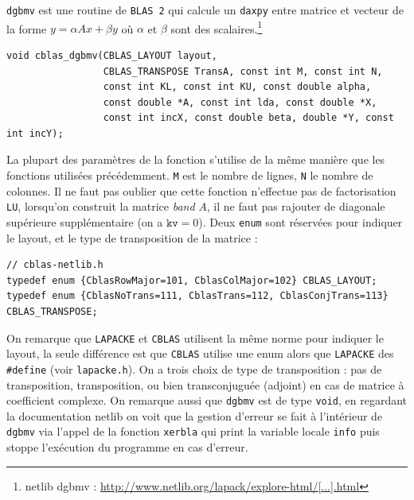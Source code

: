 \documentclass{article}
\begin{document}
\texttt{dgbmv} est une routine de \texttt{BLAS 2} qui calcule un \texttt{daxpy} entre matrice et vecteur de la forme \(y = \alpha Ax + \beta y\) où $\alpha$ et $\beta$ sont des scalaires.\footnote{netlib dgbmv : \href{http://www.netlib.org/lapack/explore-html/d7/d15/group__double__blas__level2_ga0dc187c15a47772440defe879d034888.html}{http://www.netlib.org/lapack/explore-html/[...].html}}
\begin{scriptsize}
\begin{verbatim}
void cblas_dgbmv(CBLAS_LAYOUT layout,
                 CBLAS_TRANSPOSE TransA, const int M, const int N,
                 const int KL, const int KU, const double alpha,
                 const double *A, const int lda, const double *X,
                 const int incX, const double beta, double *Y, const int incY);
\end{verbatim}
\end{scriptsize}
La plupart des paramètres de la fonction s'utilise de la même manière que les fonctions utilisées précédemment. \texttt{M} est le nombre de lignes, \texttt{N} le nombre de colonnes. Il ne faut pas oublier que cette fonction n'effectue pas de factorisation \texttt{LU}, lorsqu'on construit la matrice \textit{band} $A$, il ne faut pas rajouter de diagonale supérieure supplémentaire (on a $\texttt{kv} = 0$). Deux \texttt{enum} sont réservées pour indiquer le layout, et le type de transposition de la matrice :
\begin{scriptsize}
\begin{verbatim}
// cblas-netlib.h 
typedef enum {CblasRowMajor=101, CblasColMajor=102} CBLAS_LAYOUT;
typedef enum {CblasNoTrans=111, CblasTrans=112, CblasConjTrans=113} CBLAS_TRANSPOSE;
\end{verbatim}
\end{scriptsize}
On remarque que \texttt{LAPACKE} et \texttt{CBLAS} utilisent la même norme pour indiquer le layout, la seule différence est que \texttt{CBLAS} utilise une enum alors que \texttt{LAPACKE} des \texttt{\#define} (voir \texttt{lapacke.h}). On a trois choix de type de transposition : pas de transposition, transposition, ou bien transconjuguée (adjoint) en cas de matrice à coefficient complexe.
On remarque aussi que \texttt{dgbmv} est de type \texttt{void}, en regardant la documentation netlib on voit que la gestion d'erreur se fait à l'intérieur de \texttt{dgbmv} via l'appel de la fonction \texttt{xerbla} qui print la variable locale \texttt{info} puis stoppe l'exécution du programme en cas d'erreur.
\end{document}

